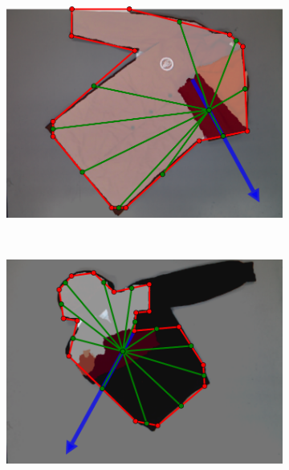 \begin{figure}[htbp]
	\centering
	\begin{subfigure}[l]{\bigtablewidth}
	    \centering
    	\includegraphics[width=\textwidth]
    	{figures/results/robe4-pnp.pdf}
	\end{subfigure}
	~
    \begin{subfigure}[r]{\bigtablewidth}
	    \centering
    	\includegraphics[width=\textwidth]
    	{figures/results/hoodie1-pnp.pdf}
	\end{subfigure}
	~
    \begin{subfigure}[l]{\bigtablewidth}
	    \centering

\end{subfigure}
\end{figure}
